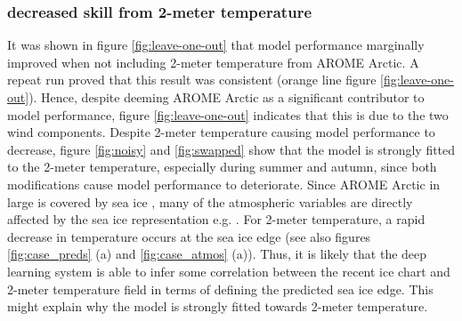 \documentclass[../main/thesis]{subfiles}
\begin{document}
\subsubsection{decreased skill from 2-meter temperature}
\label{sec:discuss_seggrad_t2m}
It was shown in figure \ref{fig:leave-one-out} that model performance marginally improved when not including 2-meter temperature from AROME Arctic. A repeat run proved that this result was consistent (orange line figure \ref{fig:leave-one-out}). Hence, despite deeming AROME Arctic as a significant contributor to model performance, figure \ref{fig:leave-one-out} indicates that this is due to the two wind components. Despite 2-meter temperature causing model performance to decrease, figure \ref{fig:noisy} and \ref{fig:swapped} show that the model is strongly fitted to the 2-meter temperature, especially during summer and autumn, since both modifications cause model performance to deteriorate. Since AROME Arctic in large is covered by sea ice \citep{Mueller2017}, many of the atmospheric variables are directly affected by the sea ice representation e.g. \citep{Mueller2017, Batrak2018, Batrak2019, Mueller2023}. For 2-meter temperature, a rapid decrease in temperature occurs at the sea ice edge \citep{Mueller2023} (see also figures \ref{fig:case_preds} (a) and \ref{fig:case_atmos} (a)). Thus, it is likely that the deep learning system is able to infer some correlation between the recent ice chart and 2-meter temperature field in terms of defining the predicted sea ice edge. This might explain why the model is strongly fitted towards 2-meter temperature. 
\end{document}
